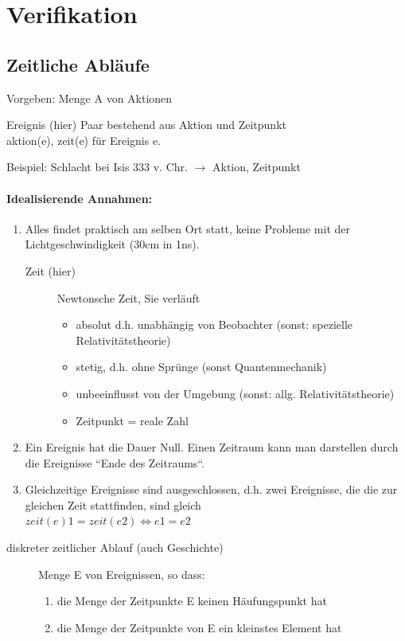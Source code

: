 \chapter{Verifikation}

\section{Zeitliche Abläufe}
Vorgeben: Menge A von Aktionen
\begin{description}
\item {Ereignis (hier)} Paar bestehend aus Aktion und Zeitpunkt\\aktion(e), zeit(e) für Ereignis e.
\end{description}
Beispiel: Schlacht bei Isis 333 v. Chr. $\rightarrow$ Aktion, Zeitpunkt
\subsubsection*{Idealisierende Annahmen:}
\begin{enumerate}
\item Alles findet praktisch am selben Ort statt, keine Probleme mit der Lichtgeschwindigkeit (30cm in 1ns).
	\begin{description}
	\item[Zeit (hier)] Newtonsche Zeit, Sie verläuft
		\begin{itemize}
		\item absolut d.h. unabhängig von Beobachter (sonst: spezielle Relativitätstheorie)
		\item stetig, d.h. ohne Sprünge (sonst Quantenmechanik)
		\item unbeeinflusst von der Umgebung (sonst: allg. Relativitätstheorie)
		\item Zeitpunkt = reale Zahl
		\end{itemize}
	\end{description}
\item Ein Ereignis hat die Dauer Null. Einen Zeitraum kann man darstellen durch die Ereignisse “Ende des Zeitraums“.
\item Gleichzeitige Ereignisse sind ausgeschlossen, d.h. zwei Ereignisse, die die zur gleichen Zeit stattfinden, sind gleich\\
$zeit(e)1 = zeit(e2) \Leftrightarrow e1 = e2 $
\end{enumerate}

\begin{description}
	\item[diskreter zeitlicher Ablauf (auch Geschichte)] Menge E von Ereignissen, so dass:
	\begin{enumerate}
		\item die Menge der Zeitpunkte E keinen Häufungspunkt hat
		\item die Menge der Zeitpunkte von E ein kleinstes Element hat
	\end{enumerate}
\end{description}

